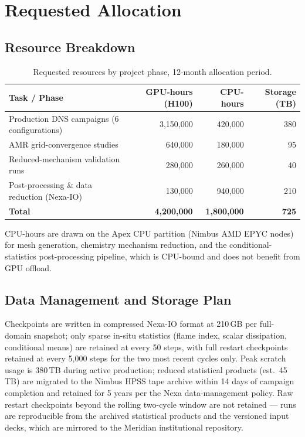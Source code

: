 \documentclass[11pt,a4paper]{scrartcl}
\begin{document}
\section{Requested Allocation}

\subsection{Resource Breakdown}
\begin{table}[h!]
\centering
\caption{Requested resources by project phase, 12-month allocation period.}
\label{tab:budget}
\begin{tabular}{@{}p{6.3cm}rrr@{}}
\toprule
\textbf{Task / Phase} & \textbf{GPU-hours (H100)} & \textbf{CPU-hours} & \textbf{Storage (TB)} \\
\midrule
Production DNS campaigns (6 configurations) & 3,150,000 & 420,000 & 380 \\
AMR grid-convergence studies                & 640,000   & 180,000 & 95 \\
Reduced-mechanism validation runs           & 280,000   & 260,000 & 40 \\
Post-processing \& data reduction (Nexa-IO) & 130,000   & 940,000 & 210 \\
\midrule
\textbf{Total}                              & \textbf{4,200,000} & \textbf{1,800,000} & \textbf{725} \\
\bottomrule
\end{tabular}
\end{table}

CPU-hours are drawn on the Apex CPU partition (Nimbus AMD EPYC nodes) for mesh generation, chemistry mechanism reduction, and the conditional-statistics post-processing pipeline, which is CPU-bound and does not benefit from GPU offload.

\subsection{Data Management and Storage Plan}
Checkpoints are written in compressed Nexa-IO format at 210\,GB per full-domain snapshot; only sparse in-situ statistics (flame index, scalar dissipation, conditional means) are retained at every 50 steps, with full restart checkpoints retained at every 5,000 steps for the two most recent cycles only. Peak scratch usage is 380\,TB during active production; reduced statistical products (est.\ 45\,TB) are migrated to the Nimbus HPSS tape archive within 14 days of campaign completion and retained for 5 years per the Nexa data-management policy. Raw restart checkpoints beyond the rolling two-cycle window are not retained --- runs are reproducible from the archived statistical products and the versioned input decks, which are mirrored to the Meridian institutional repository.
\end{document}
